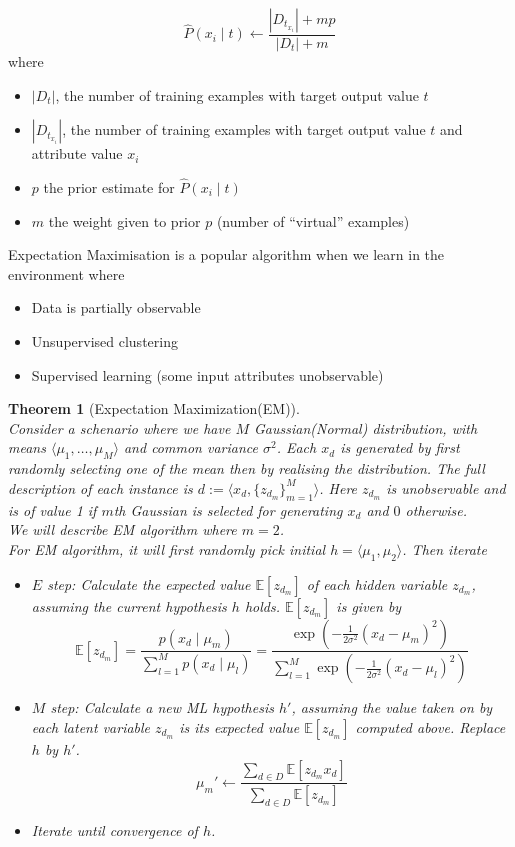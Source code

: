 \documentclass[12pt]{article}
\newtheorem{theorem}{Theorem}[section]
\theoremstyle{definition}
\begin{document}
\[
\hat{P}(x_i\mid t) \leftarrow \frac{|D_{t_{x_i}}|+mp}{|D_t|+m}
\]
where
\begin{itemize}
	\item $|D_t|$, the number of training examples with target output value $t$
	\item $|D_{t_{x_i}}|$, the number of training examples with target output value $t$ and attribute value $x_i$
	\item $p$ the prior estimate for $\hat{P}(x_i\mid t)$
	\item $m$ the weight given to prior $p$ (number of ``virtual'' examples)
\end{itemize}
Expectation Maximisation is a popular algorithm when we learn in the environment where
\begin{itemize}
	\item Data is partially observable
	\item Unsupervised clustering
	\item Supervised learning (some input attributes unobservable)
\end{itemize}
\begin{theorem}[Expectation Maximization(EM)]
\hfill\\\normalfont Consider a schenario where we have $M$ Gaussian(Normal) distribution, with means $\langle \mu_1, \ldots, \mu_M\rangle$ and common variance $\sigma^2$. Each $x_d$ is generated by first randomly selecting one of the mean then by realising the distribution. The full description of each instance is $d:=\langle x_d, \{z_{d_m}\}_{m=1}^M\rangle$. Here $z_{d_m}$ is unobservable and is of value 1 if $m$th Gaussian is selected for generating $x_d$ and $0$ otherwise.\\
We will describe EM algorithm where $m=2$.\\
For EM algorithm, it will first randomly pick initial $h=\langle \mu_1, \mu_2\rangle$. Then iterate
\begin{itemize}
	\item $E$ step: Calculate the expected value $\mathbb{E}[z_{d_m}]$ of each hidden variable $z_{d_m}$, assuming the current hypothesis $h$ holds. $\mathbb{E}[z_{d_m}]$ is given by
	\[
\mathbb{E}[z_{d_m}]=\frac{p(x_d\mid \mu_m)}{\sum_{l=1}^M p(x_d\mid \mu_l)} = \frac{\exp(-\frac{1}{2\sigma^2}(x_d-\mu_m)^2)}{\sum_{l=1}^M \exp(-\frac{1}{2\sigma^2}(x_d-\mu_l)^2)}
	\]
	\item $M$ step: Calculate a new ML hypothesis $h'$, assuming the value taken on by each latent variable $z_{d_m}$ is its expected value $\mathbb{E}[z_{d_m}]$ computed above. Replace $h$ by $h'$.
	\[
\mu_m'\leftarrow \frac{\sum_{d\in D}\mathbb{E}[z_{d_m}x_d]}{\sum_{d\in D}\mathbb{E}[z_{d_m}]}
	\]
	\item Iterate until convergence of $h$.
\end{itemize}
\end{theorem}
\end{document}
